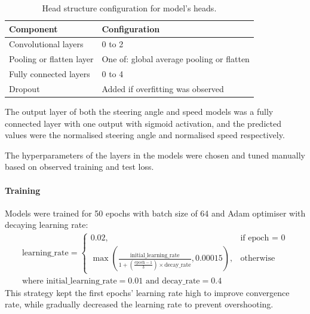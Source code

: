 \documentclass{article}
\begin{document}
\begin{table}[H]
  \centering
  \renewcommand{\arraystretch}{1.2}
  \begin{tabular}{|l|l|}
    \hline
    \textbf{Component}       & \textbf{Configuration}                    \\
    \hline
    Convolutional layers     & 0 to 2                                    \\
    Pooling or flatten layer & One of: global average pooling or flatten \\
    Fully connected layers   & 0 to 4                                    \\
    Dropout                  & Added if overfitting was observed         \\
    \hline
  \end{tabular}
  \vspace{0.5em}
  \caption{Head structure configuration for model's heads.}
  \label{tab:head_structure}
\end{table}

The output layer of both the steering angle and speed models was a fully connected layer with one output with sigmoid activation, and the predicted values were the normalised steering angle and normalised speed respectively.

The hyperparameters of the layers in the models were chosen and tuned manually based on observed training and test loss.

\paragraph{Training}

Models were trained for 50 epochs with batch size of 64 and Adam optimiser with decaying learning rate:
\begin{equation}
  \begin{aligned}
    \text{learning\_rate} =
    \begin{cases}
      0.02,                                                                                                                                   & \text{if epoch = 0}
      \\
      \max\left(\frac{\text{initial\_learning\_rate}}{1 + \left(\frac{\text{epoch} - 1}{3}\right) \times \text{decay\_rate}}, 0.00015\right), & \text{otherwise}
    \end{cases}
    \\
    \text{where } \text{initial\_learning\_rate} = 0.01 \text{ and } \text{decay\_rate} = 0.4
  \end{aligned}
  \label{eq:learning_rate}
\end{equation}
This strategy kept the first epochs' learning rate high to improve convergence rate, while gradually decreased the learning rate to prevent overshooting.
\end{document}
